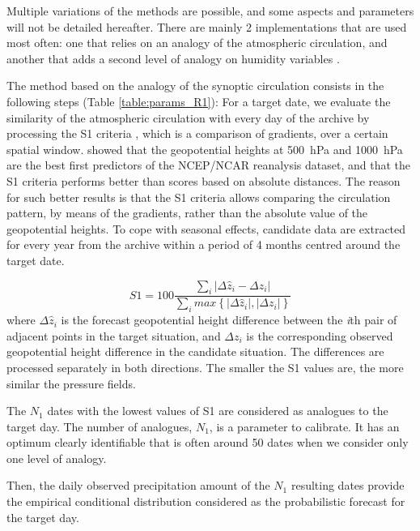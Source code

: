 \documentclass[twocol]{ametsoc}
\begin{document}
Multiple variations of the methods are possible, and some aspects and parameters will not be detailed hereafter. There are mainly 2 implementations that are used most often: one that relies on an analogy of the atmospheric circulation, and another that adds a second level of analogy on humidity variables \citep{Obled2002, Bontron2005, Marty2012}.

The method based on the analogy of the synoptic circulation consists in the following steps (Table \ref{table:params_R1}): For a target date, we evaluate the similarity of the atmospheric circulation with every day of the archive by processing the S1 criteria \citep[Eq.\ (\ref{eq:S1}), ][]{Teweles1954, Drosdowsky2003}, which is a comparison of gradients, over a certain spatial window. \citet{Bontron2005} showed that the geopotential heights at 500~hPa and 1000~hPa are the best first predictors of the NCEP/NCAR reanalysis dataset, and that the S1 criteria performs better than scores based on absolute distances. The reason for such better results is that the S1 criteria allows comparing the circulation pattern, by means of the gradients, rather than the absolute value of the geopotential heights. To cope with seasonal effects, candidate data are extracted for every year from the archive within a period of 4 months centred around the target date.

\begin{equation}
\label{eq:S1}
S1=100 \frac {\displaystyle \sum_{i} \vert \Delta\hat{z}_{i} - \Delta z_{i} \vert}
{\displaystyle \sum_{i} max\left\lbrace \vert \Delta\hat{z}_{i} \vert , \vert \Delta z_{i} \vert \right\rbrace }
\end{equation}
where $\Delta \hat{z}_{i}$ is the forecast geopotential height difference between the \textit{i}th pair of adjacent points in the target situation, and $\Delta z_{i}$ is the corresponding observed geopotential height difference in the candidate situation. The differences are processed separately in both directions. The smaller the S1 values are, the more similar the pressure fields.

The $N_{1}$ dates with the lowest values of S1 are considered as analogues to the target day. The number of analogues, $N_{1}$, is a parameter to calibrate. It has an optimum clearly identifiable that is often around 50 dates when we consider only one level of analogy.

Then, the daily observed precipitation amount of the $N_{1}$ resulting dates provide the empirical conditional distribution considered as the probabilistic forecast for the target day.
\end{document}
